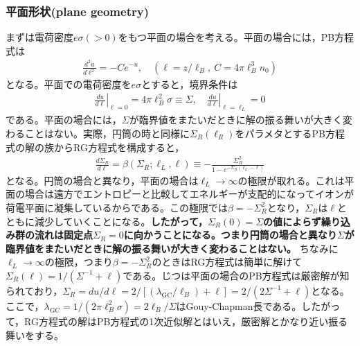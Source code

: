 \documentclass[11pt,a4paper]{ltjsarticle}
\theoremstyle{definition}
\theoremstyle{remark}
\begin{document}
\subsubsection{平面形状(plane geometry)}
まずは電荷密度$e\sigma(>0)$をもつ平面の場合を考える。平面の場合には，PB方程式は
\begin{align}
  \frac{d^2 u}{d\ell ^2} = - C e^{-u},\quad (\ell=z/\ell_B,\ C=4\pi\ell_B^3n_0) \label{eq:pb_plane}
\end{align}
となる。平面での電荷密度を$e\sigma$とすると，境界条件は
\begin{align}
  \left.\frac{du}{d\ell}\right|_{\ell=0} = 4\pi \ell_B^2 \sigma\equiv \Sigma, \quad \left.\frac{du}{d\ell}\right|_{\ell=\ell_L} = 0 \label{eq:boundary_plane}
\end{align}
である。平面の場合には，$\Sigma$が臨界値をまたいだときに解の振る舞いが大きく変わることはない。実際，円筒の時と同様に$\Sigma_R(\ell_R)$をパラメタとするPB方程式の解の族からRG方程式を構成すると，
\begin{align}
  \frac{d\Sigma_R}{d\ell} = \beta(\Sigma_R;\ell_L,\ell) \equiv -\frac{\Sigma_R^2}{1-e^{-\Sigma_R(\ell_L-\ell)}} \label{eq:beta_plane}
\end{align}
となる。円筒の場合と異なり，平面の場合は$\ell_L\to \infty$の極限が取れる。これは平面の場合は遠方でエントロピーと比較してエネルギーが支配的になってイオンが荷電平面に凝集しているからである。この極限では$\beta=-\Sigma_R^2$となり，$\Sigma_R$は$\ell$とともに減少していくことになる。\textbf{したがって，$\Sigma_R(0)=\Sigma$の値によらず繰り込み群の流れは固定点$\Sigma_R=0$に向かうことになる。つまり円筒の場合と異なり$\Sigma$が臨界値をまたいだときに解の振る舞いが大きく変わることはない。} ちなみに$\ell_L\to \infty$の極限，つまり$\beta=-\Sigma_R^2$のときはRG方程式は簡単に解けて$\Sigma_R(\ell)=1/(\Sigma^{-1}+ \ell)$である。じつは平面の場合のPB方程式は厳密解が知られており，$\Sigma_R=du/d\ell=2/[(\lambda_\mathrm{GC}/\ell_B)+\ell]=2/(2\Sigma^{-1}+\ell)$となる。ここで，$\lambda_\mathrm{GC}=1/(2\pi \ell_B^2 \sigma)=2\ell_B/\Sigma$はGouy-Chapman長である。したがって，RG方程式の解はPB方程式の1次近似解とはいえ，厳密解とかなり近い振る舞いをする。
\end{document}
